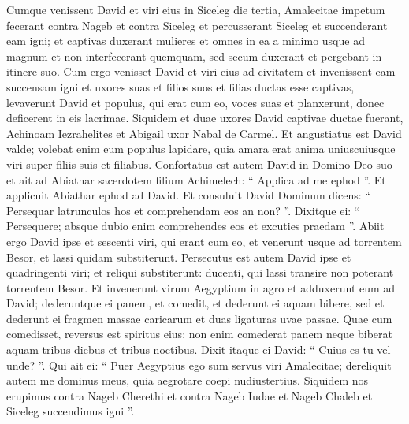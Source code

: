 \begin{biblechapter}
\begin{biblechapter}
\begin{biblechapter}
\begin{biblechapter}
\begin{biblechapter}
\begin{biblechapter}
\begin{biblechapter}
\begin{biblechapter}
\begin{biblechapter}
\begin{biblechapter}
\begin{biblechapter}
\begin{biblechapter}
\begin{biblechapter}
\begin{biblechapter}
\begin{biblechapter}
\begin{biblechapter}
\begin{biblechapter}
\begin{biblechapter}
\begin{biblechapter}
\begin{biblechapter}
\begin{biblechapter}
\begin{biblechapter}
\begin{biblechapter}
\begin{biblechapter}
\begin{biblechapter}
\begin{biblechapter}
\begin{biblechapter}
\begin{biblechapter}
\begin{biblechapter}
\begin{biblechapter}
\verse Cumque venissent David et viri eius in Siceleg die tertia, Amalecitae impetum fecerant contra Nageb et contra Siceleg et percusserant Siceleg et succenderant eam igni; 
\verse et captivas duxerant mulieres et omnes in ea a minimo usque ad magnum et non interfecerant quemquam, sed secum duxerant et pergebant in itinere suo. 
\verse Cum ergo venisset David et viri eius ad civitatem et invenissent eam succensam igni et uxores suas et filios suos et filias ductas esse captivas, 
\verse levaverunt David et populus, qui erat cum eo, voces suas et planxerunt, donec deficerent in eis lacrimae. 
\verse Siquidem et duae uxores David captivae ductae fuerant, Achinoam Iezrahelites et Abigail uxor Nabal de Carmel.
 \verse Et angustiatus est David valde; volebat enim eum populus lapidare, quia amara erat anima uniuscuiusque viri super filiis suis et filiabus. Confortatus est autem David in Domino Deo suo 
\verse et ait ad Abiathar sacerdotem filium Achimelech: “ Applica ad me ephod ”. Et applicuit Abiathar ephod ad David. 
\verse Et consuluit David Dominum dicens: “ Persequar latrunculos hos et comprehendam eos an non? ”. Dixitque ei: “ Persequere; absque dubio enim comprehendes eos et excuties praedam ”. 
\verse Abiit ergo David ipse et sescenti viri, qui erant cum eo, et venerunt usque ad torrentem Besor, et lassi quidam substiterunt. 
\verse Persecutus est autem David ipse et quadringenti viri; et reliqui substiterunt: ducenti, qui lassi transire non poterant torrentem Besor.
 \verse Et invenerunt virum Aegyptium in agro et adduxerunt eum ad David; dederuntque ei panem, et comedit, et dederunt ei aquam bibere, 
\verse sed et dederunt ei fragmen massae caricarum et duas ligaturas uvae passae. Quae cum comedisset, reversus est spiritus eius; non enim comederat panem neque biberat aquam tribus diebus et tribus noctibus. 
\verse Dixit itaque ei David: “ Cuius es tu vel unde? ”. Qui ait ei: “ Puer Aegyptius ego sum servus viri Amalecitae; dereliquit autem me dominus meus, quia aegrotare coepi nudiustertius. 
\verse Siquidem nos erupimus contra Nageb Cherethi et contra Nageb Iudae et Nageb Chaleb et Siceleg succendimus igni ”. 

\end{biblechapter}
\end{biblechapter}
\end{biblechapter}
\end{biblechapter}
\end{biblechapter}
\end{biblechapter}
\end{biblechapter}
\end{biblechapter}
\end{biblechapter}
\end{biblechapter}
\end{biblechapter}
\end{biblechapter}
\end{biblechapter}
\end{biblechapter}
\end{biblechapter}
\end{biblechapter}
\end{biblechapter}
\end{biblechapter}
\end{biblechapter}
\end{biblechapter}
\end{biblechapter}
\end{biblechapter}
\end{biblechapter}
\end{biblechapter}
\end{biblechapter}
\end{biblechapter}
\end{biblechapter}
\end{biblechapter}
\end{biblechapter}
\end{biblechapter}
